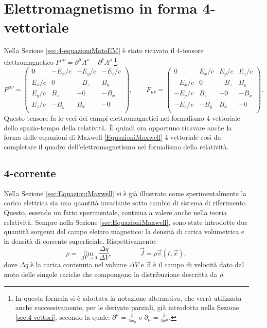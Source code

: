 \section{Elettromagnetismo in forma 4-vettoriale}
Nella Sezione \ref{sec:4-equazioniMotoEM} è stato ricavato il 4-tensore elettromagnetico $F^{\mu\nu}=\partial^\mu A^\nu-\partial^\nu A^\mu\ $\footnote{In questa formula si è adottata la notazione alternativa, che verrà utilizzata anche successivamente, per le derivate parziali, già introdotta nella Sezione \ref{sec:4-vettori}, secondo la quale: $\partial^\mu=\frac{\partial\ }{\partial x_\mu}$ e $\partial_\mu=\frac{\partial\ }{\partial x^\mu}$.}:
\begin{equation*}
        F^{\mu\nu}=
    \begin{pmatrix}
        0&-E_x/c&-E_y/c&-E_z/c\\
        E_x/c&0&-B_z&B_y\\
        E_y/c&B_z&-0&-B_x\\
        E_z/c&-B_y&B_x&-0\\
 \end{pmatrix},\qquad
 F_{\mu\nu}=
 \begin{pmatrix}
     0&E_x/c&E_y/c&E_z/c\\
     -E_x/c&0&-B_z&B_y\\
     -E_y/c&B_z&-0&-B_x\\
     -E_z/c&-B_y&B_x&-0\\
\end{pmatrix}.
\end{equation*}
Questo tensore fa le veci dei campi elettromagnetici nel formalismo 4-vettoriale dello spazio-tempo della relatività.
È quindi ora opportuno ricavare anche la forma delle equazioni di Maxwell \eqref{EquazioniMaxwell} 4-vettoriale così da completare il quadro dell'elettromagnetismo nel formalismo della relatività.
\subsection{4-corrente}\label{sec:4-corrente}
Nella Sezione \ref{sec:EquazioniMaxwell} si è già illustrato come sperimentalmente la carica elettrica sia una quantità invariante sotto cambio di sistema di riferimento. Questo, essendo un fatto sperimentale, continua a valere anche nella teoria relatività. Sempre nella Sezione \ref{sec:EquazioniMaxwell}, sono state introdotte due quantità sorgenti del campo elettro magnetico: la densità di carica volumetrica e la densità di corrente superficiale. Rispettivamente:
\begin{equation}
    \rho=\lim_{\Delta V\rightarrow 0}\frac{\Delta q}{\Delta V},\qquad\qquad \vec J=\rho\vec v(t,\vec x),\label{defRhoJ}
\end{equation}
dove $\Delta q$ è la carica contenuta nel volume $\Delta V$ e $\vec v$ è il campo di velocità dato dal moto delle singole cariche che compongono la distribuzione descritta da $\rho$.\\

